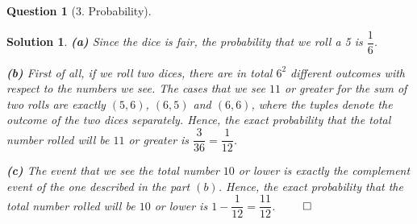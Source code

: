 \documentclass{article} %
\theoremstyle{quest}
\newtheorem*{question}{Question}
\newtheorem*{solution}{Solution}
\begin{document}
\pagebreak

\begin{question}[3. Probability]
\end{question}
\begin{solution}
\textbf{(a)} Since the dice is fair, the probability that we roll a 5 is $\dfrac{1}{6}$.

\smallskip

\textbf{(b)} First of all, if we roll two dices, there are in total $6^2$ different 
outcomes with respect to the numbers we see. The cases that we see $11$ or greater for 
the sum of two rolls are exactly $(5,6)$, $(6,5)$ and $(6,6)$, where the tuples denote
the outcome of the two dices separately. Hence, the exact probability that the total
number rolled will be $11$ or greater is $\dfrac{3}{36} = \dfrac{1}{12}$. 

\smallskip

\textbf{(c)} The event that we see the total number $10$ or lower is exactly the complement event
of the one described in the part $(b)$. Hence, the exact probability that the total
number rolled will be $10$ or lower is $1 - \dfrac{1}{12} = \dfrac{11}{12}$. $\qed$

\end{solution}
\end{document}
